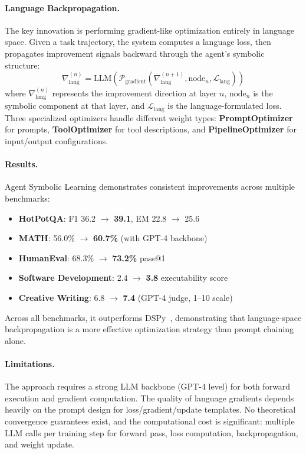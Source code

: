 \paragraph{Language Backpropagation.}
The key innovation is performing gradient-like optimization entirely in language space. Given a task trajectory, the system computes a language loss, then propagates improvement signals backward through the agent's symbolic structure:
\begin{equation}
\nabla_{\text{lang}}^{(n)} = \text{LLM}\left(\mathcal{P}_{\text{gradient}}(\nabla_{\text{lang}}^{(n+1)}, \text{node}_n, \mathcal{L}_{\text{lang}})\right)
\end{equation}
where $\nabla_{\text{lang}}^{(n)}$ represents the improvement direction at layer $n$, $\text{node}_n$ is the symbolic component at that layer, and $\mathcal{L}_{\text{lang}}$ is the language-formulated loss. Three specialized optimizers handle different weight types: \textbf{PromptOptimizer} for prompts, \textbf{ToolOptimizer} for tool descriptions, and \textbf{PipelineOptimizer} for input/output configurations.

\paragraph{Results.}
Agent Symbolic Learning demonstrates consistent improvements across multiple benchmarks:
\begin{itemize}
    \item \textbf{HotPotQA}: F1 36.2 $\rightarrow$ \textbf{39.1}, EM 22.8 $\rightarrow$ 25.6
    \item \textbf{MATH}: 56.0\% $\rightarrow$ \textbf{60.7\%} (with GPT-4 backbone)
    \item \textbf{HumanEval}: 68.3\% $\rightarrow$ \textbf{73.2\%} pass@1
    \item \textbf{Software Development}: 2.4 $\rightarrow$ \textbf{3.8} executability score
    \item \textbf{Creative Writing}: 6.8 $\rightarrow$ \textbf{7.4} (GPT-4 judge, 1--10 scale)
\end{itemize}
Across all benchmarks, it outperforms DSPy~\citep{khattab2023dspy}, demonstrating that language-space backpropagation is a more effective optimization strategy than prompt chaining alone.

\paragraph{Limitations.}
The approach requires a strong LLM backbone (GPT-4 level) for both forward execution and gradient computation. The quality of language gradients depends heavily on the prompt design for loss/gradient/update templates. No theoretical convergence guarantees exist, and the computational cost is significant: multiple LLM calls per training step for forward pass, loss computation, backpropagation, and weight update.


